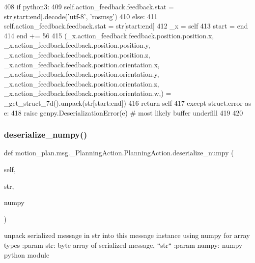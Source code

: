 \begin{DoxyCode}
408       \textcolor{keywordflow}{if} python3:
409         self.action\_feedback.feedback.stat = str[start:end].decode(\textcolor{stringliteral}{'utf-8'}, \textcolor{stringliteral}{'rosmsg'})
410       \textcolor{keywordflow}{else}:
411         self.action\_feedback.feedback.stat = str[start:end]
412       \_x = self
413       start = end
414       end += 56
415       (\_x.action\_feedback.feedback.position.position.x, \_x.action\_feedback.feedback.position.position.y, 
      \_x.action\_feedback.feedback.position.position.z, \_x.action\_feedback.feedback.position.orientation.x, 
      \_x.action\_feedback.feedback.position.orientation.y, \_x.action\_feedback.feedback.position.orientation.z, 
      \_x.action\_feedback.feedback.position.orientation.w,) = \_get\_struct\_7d().unpack(str[start:end])
416       \textcolor{keywordflow}{return} self
417     \textcolor{keywordflow}{except} struct.error \textcolor{keyword}{as} e:
418       \textcolor{keywordflow}{raise} genpy.DeserializationError(e)  \textcolor{comment}{# most likely buffer underfill}
419 
420 
\end{DoxyCode}
\mbox{\label{classmotion__plan_1_1msg_1_1__PlanningAction_1_1PlanningAction_a7f310fc818ff51a258529b523b0f7ba5}} 
\subsubsection{\texorpdfstring{deserialize\+\_\+numpy()}{deserialize\_numpy()}}
{\footnotesize\ttfamily def motion\+\_\+plan.\+msg.\+\_\+\+Planning\+Action.\+Planning\+Action.\+deserialize\+\_\+numpy (\begin{DoxyParamCaption}\item[{}]{self,  }\item[{}]{str,  }\item[{}]{numpy }\end{DoxyParamCaption})}

\begin{DoxyVerb}unpack serialized message in str into this message instance using numpy for array types
:param str: byte array of serialized message, ``str``
:param numpy: numpy python module
\end{DoxyVerb}
 

